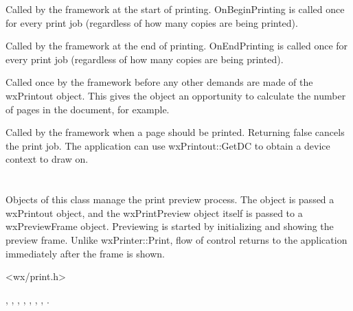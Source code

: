 \label{wxprintoutonbeginprinting}


Called by the framework at the start of printing. OnBeginPrinting is called once for every
print job (regardless of how many copies are being printed).


\label{wxprintoutonendprinting}


Called by the framework at the end of printing. OnEndPrinting
is called once for every print job (regardless of how many copies are being printed).


\label{wxprintoutonprepareprinting}


Called once by the framework before any other demands are made of the
wxPrintout object. This gives the object an opportunity to calculate the
number of pages in the document, for example.


\label{wxprintoutonprintpage}


Called by the framework when a page should be printed. Returning false cancels
the print job. The application can use wxPrintout::GetDC to obtain a device
context to draw on.

\section{}\label{wxprintpreview}

Objects of this class manage the print preview process. The object is passed
a wxPrintout object, and the wxPrintPreview object itself is passed to
a wxPreviewFrame object. Previewing is started by initializing and showing
the preview frame. Unlike wxPrinter::Print, flow of control returns to the application
immediately after the frame is shown.




<wx/print.h>


, 
, 
, 
, 
, 
, 
, 
.

